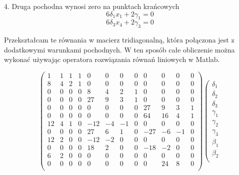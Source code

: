 \documentclass[varwidth,12pt,a4paper]{article}
\begin{document}
4. Druga pochodna wynosi zero na punktach krańcowych
\begin{equation}
    6\delta _1 x_1 + 2 \gamma _1 = 0
\end{equation}
\begin{equation}
    6\delta _3 x_4 + 2 \gamma _3 = 0
\end{equation}

Przekształcam te równania w macierz tridiagonalną, która połączona jest z dodatkowymi warunkami pochodnych. 
W ten sposób całe obliczenie można wykonać używając operatora rozwiązania równań liniowych w Matlab.


$$
\left( \begin{array}{cccccccccccc}
     1  &  1  &  1  &  1 &   0&    0&    0 &   0&    0&    0&    0&    0 \\
     8  &  4  &  2  &  1 &   0&    0&    0 &   0&    0&    0&    0&    0 \\
     0  &  0  &  0  &  0 &   8&    4&    2 &   1&    0&    0&    0&    0 \\
     0  &  0  &  0  &  0 &  27&    9&    3 &   1&    0&    0&    0&    0 \\
     0  &  0  &  0  &  0 &   0&    0&    0 &   0&   27&    9&    3&    1 \\
     0  &  0  &  0  &  0 &   0&    0&    0 &   0&   64&   16&    4&    1 \\
    12  &  4  &  1  &  0 & -12&   -4&   -1 &   0&    0&    0&    0&    0 \\
     0  &  0  &  0  &  0 &  27&    6&    1 &   0&  -27&   -6&   -1&    0 \\
    12  &  2  &  0  &  0 & -12&   -2&    0 &   0&    0&    0&    0&    0 \\
     0  &  0  &  0  &  0 &  18&    2&    0 &   0&  -18&   -2&    0&    0 \\
     6  &  2  &  0  &  0 &   0&    0&    0 &   0&    0&    0&    0&    0 \\
     0  &  0  &  0  &  0 &   0&    0&    0 &   0&    0&   24&    8&    0 \\
\end{array} \right) \left( \begin{array}{c}
\delta _1\\
\delta_2\\
\delta_3\\
\gamma _1\\
\gamma _2\\
\gamma_3\\
\beta _1\\
\beta _2\\

\end{array}$$
\end{document}
